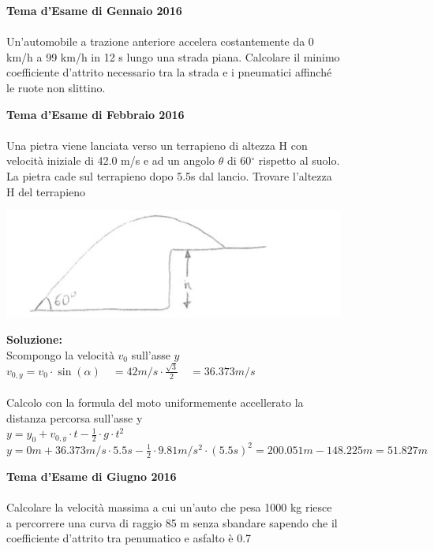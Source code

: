 
\begin{figure}[h!]
\textbf{Tema d'Esame di Gennaio 2016}\\ \\
Un’automobile a trazione anteriore accelera costantemente da 0 km/h a 99 km/h in 12 s
lungo una strada piana. Calcolare il minimo coefficiente d’attrito necessario tra la strada e i
pneumatici affinché le ruote non slittino.
\end{figure}


\begin{figure}[h!]
\textbf{Tema d'Esame di Febbraio 2016}\\ \\
Una pietra viene lanciata verso un terrapieno di altezza H con velocità iniziale di 42.0 m/s e ad un angolo $\theta$ di 60$^{\circ}$ rispetto al suolo. La pietra cade sul terrapieno dopo 5.5s dal lancio. Trovare l'altezza H del terrapieno
\\
	\begin{center}
		\includegraphics[scale=0.8]{ES1/FEB012016.jpg}
	\end{center}
\begin{boxed}
\textbf{Soluzione:}\\
Scompongo la velocità $v_0$ sull'asse $y$\\
$v_{0,y}= v_0 \cdot \sin(\alpha) \quad = 42m/s\cdot \frac{\sqrt{3}}{2} \quad = 36.373m/s$ \\ \\
Calcolo con la formula del moto uniformemente accellerato la distanza percorsa sull'asse y \\
$y= y_0 + v_{0,y}\cdot t -\frac{1}{2}\cdot g \cdot t^2$\\
$y=0m+36.373m/s \cdot 5.5s -\frac{1}{2}\cdot 9.81 m/s^2 \cdot (5.5s)^2 = 200.051m - 148.225m = 51.827m$
\end{boxed}    
   
\end{figure}


\begin{figure}[h!]
\textbf{Tema d'Esame di Giugno 2016}\\ \\
Calcolare la velocità massima a cui un'auto che pesa 1000 kg riesce a percorrere una curva di raggio 85 m senza sbandare sapendo che il coefficiente d'attrito tra penumatico e asfalto è 0.7
\end{figure}


